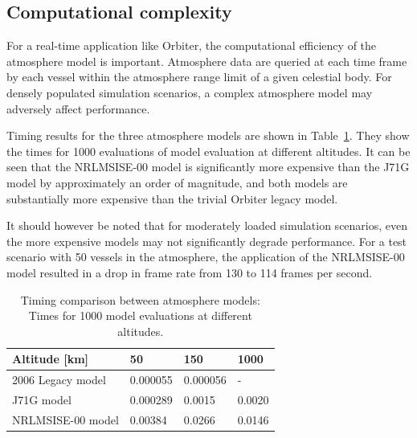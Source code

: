 \documentclass[Orbiter Technical Reference.tex]{subfiles}
\begin{document}
\subsection {Computational complexity}
For a real-time application like Orbiter, the computational efficiency of the atmosphere model is important. Atmosphere data are queried at each time frame by each vessel within the atmosphere range limit of a given celestial body. For densely populated simulation scenarios, a complex atmosphere model may adversely affect performance.

Timing results for the three atmosphere models are shown in Table~\ref{tab:timing}. They show the times for 1000 evaluations of model evaluation at different altitudes. It can be seen that the NRLMSISE-00 model is significantly more expensive than the J71G model by approximately an order of magnitude, and both models are substantially more expensive than the trivial Orbiter legacy model.

It should however be noted that for moderately loaded simulation scenarios, even the more expensive models may not significantly degrade performance. For a test scenario with 50 vessels in the atmosphere, the application of the NRLMSISE-00 model resulted in a drop in frame rate from 130 to 114 frames per second.
\begin{table}
\begin{tabular}{l|lll}
Altitude [km] & 50 & 150 & 1000 \\ \hline
2006 Legacy model & 0.000055 & 0.000056 & - \\
J71G model & 0.000289 & 0.0015 & 0.0020 \\
NRLMSISE-00 model & 0.00384 & 0.0266 & 0.0146
\end{tabular}
\caption{Timing comparison between atmosphere models: Times for 1000 model evaluations at different altitudes.}
\label{tab:timing}
\end{table}
\end{document}
